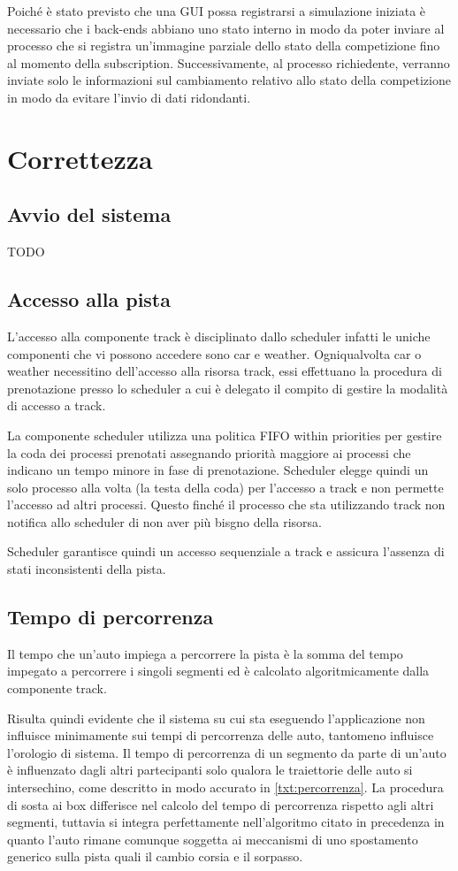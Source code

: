 \documentclass[11pt,a4paper]{report}
\begin{document}
Poiché è stato previsto che una GUI possa registrarsi a simulazione iniziata è necessario che i back-ends abbiano uno stato interno in modo da poter inviare al processo che si registra un'immagine parziale dello stato della competizione fino al momento della subscription. Successivamente, al processo richiedente, verranno inviate solo le informazioni sul cambiamento relativo allo stato della competizione in modo da evitare l'invio di dati ridondanti.
\chapter{Correttezza}
\section{Avvio del sistema}
TODO
\section{Accesso alla pista}
L'accesso alla componente track è disciplinato dallo scheduler infatti le uniche componenti che vi possono accedere sono car e weather. Ogniqualvolta car o weather necessitino dell'accesso alla risorsa track, essi effettuano la procedura di prenotazione presso lo scheduler a cui è delegato il compito di gestire la modalità di accesso a track.

La componente scheduler utilizza una politica FIFO within priorities per gestire la coda dei processi prenotati assegnando priorità maggiore ai processi che indicano un tempo minore in fase di prenotazione.
Scheduler elegge quindi un solo processo alla volta (la testa della coda) per l'accesso a track e non permette l'accesso ad altri processi. Questo finché il processo che sta utilizzando track non notifica allo scheduler di non aver più bisgno della risorsa.

Scheduler garantisce quindi un accesso sequenziale a track e assicura l'assenza di stati inconsistenti della pista.

\section{Tempo di percorrenza}
Il tempo che un'auto impiega a percorrere la pista è la somma del tempo impegato a percorrere i singoli segmenti ed è calcolato algoritmicamente dalla componente track.

Risulta quindi evidente che il sistema su cui sta eseguendo l'applicazione non influisce minimamente sui tempi di percorrenza delle auto, tantomeno influisce l'orologio di sistema.
Il tempo di percorrenza di un segmento da parte di un'auto è influenzato dagli altri partecipanti solo qualora le traiettorie delle auto si intersechino, come descritto in modo accurato in \ref{txt:percorrenza}.
La procedura di sosta ai box differisce nel calcolo del tempo di percorrenza rispetto agli altri segmenti, tuttavia si integra perfettamente nell'algoritmo citato in precedenza in quanto l'auto rimane comunque soggetta ai meccanismi di uno spostamento generico sulla pista quali il cambio corsia e il sorpasso.
\end{document}
